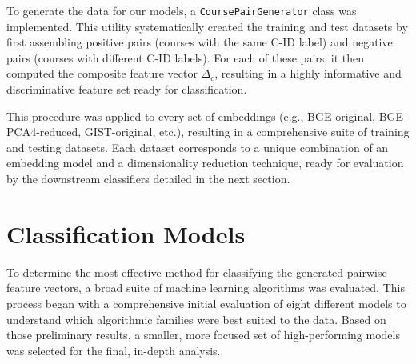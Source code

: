 To generate the data for our models, a \verb|CoursePairGenerator| class was implemented. This utility systematically created the training and test datasets by first assembling positive pairs (courses with the same C-ID label) and negative pairs (courses with different C-ID labels). For each of these pairs, it then computed the composite feature vector \(\Delta_c\), resulting in a highly informative and discriminative feature set ready for classification.

This procedure was applied to every set of embeddings (e.g., BGE-original, BGE-PCA4-reduced, GIST-original, etc.), resulting in a comprehensive suite of training and testing datasets. Each dataset corresponds to a unique combination of an embedding model and a dimensionality reduction technique, ready for evaluation by the downstream classifiers detailed in the next section.

\section{Classification Models}
To determine the most effective method for classifying the generated pairwise feature vectors, a broad suite of machine learning algorithms was evaluated. This process began with a comprehensive initial evaluation of eight different models to understand which algorithmic families were best suited to the data. Based on those preliminary results, a smaller, more focused set of high-performing models was selected for the final, in-depth analysis.

